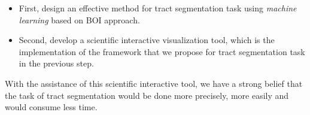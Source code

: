 \begin{itemize}
	\item First, design an effective method for tract segmentation task using \emph{machine learning} based on BOI approach.
	\item Second, develop a scientific interactive visualization tool, which is the implementation of the framework that we propose for tract segmentation task in the previous step.%
\end{itemize}
With the assistance of this scientific interactive tool, we have a strong belief that the task of tract segmentation would be done more precisely, more easily and would consume less time.
